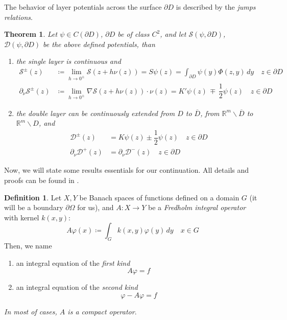 \documentclass[10pt, a4paper, twoside, openright]{book}
\theoremstyle{definition}
\newtheorem{definition}[subsection]{Definition}
\theoremstyle{plain}
\newtheorem{theorem}[subsection]{Theorem}
\theoremstyle{plain}
\theoremstyle{plain}
\theoremstyle{plain}
\theoremstyle{plain}
\theoremstyle{plain}
\theoremstyle{plain}
\theoremstyle{plain}
\let\phi\varphi
\begin{document}
The behavior of layer potentials across the surface $\partial D$ is described by the \emph{jumps relations}.
\begin{theorem}
 Let $\psi\in C(\partial D)$, $\partial D$ be of class $C^2$, and let $\mathcal{S}(\psi,\partial D)$, $\mathcal{D}(\psi,\partial D)$ be the above defined potentials, than
 \begin{enumerate}
  \item the single layer is continuous and 
  \begin{subequations}
  \begin{align}
   \mathcal{S}^\pm(z) &\coloneqq\lim_{h\to 0^\pm}\mathcal{S}(z+h\nu(z)) = S\psi(z)=\int_{\partial D}\psi(y)\Phi(z,y)\,dy \quad z\in\partial D \label{eq:single-pm-0}\\
   \partial_\nu\mathcal{S}^\pm(z) &\coloneqq \lim_{h\to0^\pm} \nabla\mathcal{S}(z+h\nu(z))\cdot\nu(z) =  K'\psi(z) \,\mp\,\dfrac{1}{2}\psi(z) \quad z\in\partial D\label{eq:single-pm-1}
  \end{align}
 \end{subequations}
 \item the double layer can be continuously extended from $D$ to $\overline{D}$, from $\mathbb{R}^m\backslash \overline{D}$ to $\mathbb{R}^m\backslash D$, and
  \begin{subequations}
  \begin{align}
   \mathcal{D}^\pm(z) &= K\psi(z) \pm\dfrac{1}{2}\psi(z)\quad z\in\partial D \label{eq:double-pm-0}\\
   \partial_\nu\mathcal{D}^+(z) &= \partial_\nu\mathcal{D}^-(z) \quad z\in\partial D\label{eq:double-pm-1}
  \end{align}
  \end{subequations}
 \end{enumerate}
\end{theorem}
Now, we will state some results essentials for our continuation.
All details and proofs can be found in \cite{kress:book}.
\begin{definition}
 Let $X,Y$ be Banach spaces of functions defined on a domain $G$ (it will be a boundary $\partial \Omega$ for us), and $A:X\to Y$ be a \emph{Fredholm integral operator} with kernel $k(x,y)$:
 \begin{equation}
  A\phi(x)\coloneqq\int_G k(x,y)\phi(y)\,dy\quad x\in G \label{eq:def-integral-operator}
 \end{equation}
 Then, we name
 \begin{enumerate}
  \item an integral equation of the \emph{first kind}
   \begin{equation}
    A\phi=f
   \end{equation}
  \item an integral equation of the \emph{second kind}
   \begin{equation}
    \phi - A\phi=f
   \end{equation}
 \end{enumerate}
\emph{In most of cases, $A$ is a compact operator}.
\end{definition}
\end{document}
